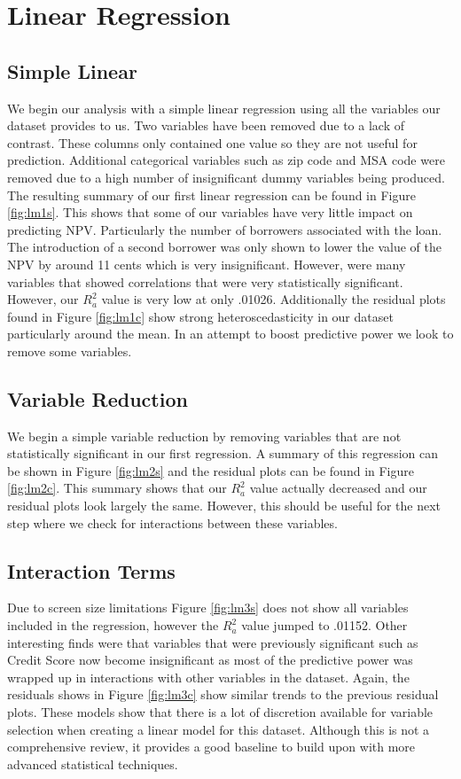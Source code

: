 \documentclass[10pt,twocolumn,letterpaper]{article}
\begin{document}

\section{Linear Regression}
\subsection{Simple Linear}
We begin our analysis with a simple linear regression using all the variables our dataset provides to us. Two variables have been removed due to a lack of contrast. These columns only contained one value so they are not useful for prediction. Additional categorical variables such as zip code and MSA code were removed due to a high number of insignificant dummy variables being produced. The resulting summary of our first linear regression can be found in Figure \ref{fig:lm1s}. This shows that some of our variables have very little impact on predicting NPV. Particularly the number of borrowers associated with the loan. The introduction of a second borrower was only shown to lower the value of the NPV by around 11 cents which is very insignificant. However, were many variables that showed correlations that were very statistically significant. However, our $R^2_a$ value is very low at only .01026. Additionally the residual plots found in Figure \ref{fig:lm1c} show strong heteroscedasticity in our dataset particularly around the mean. In an attempt to boost predictive power we look to remove some variables. 

\subsection{Variable Reduction}

We begin a simple variable reduction by removing variables that are not statistically significant in our first regression. A summary of this regression can be shown in Figure \ref{fig:lm2s} and the residual plots can be found in Figure \ref{fig:lm2c}. This summary shows that our $R^2_a$ value actually decreased and our residual plots look largely the same. However, this should be useful for the next step where we check for interactions between these variables.

\subsection{Interaction Terms}
Due to screen size limitations Figure \ref{fig:lm3s} does not show all variables included in the regression, however the $R^2_a$ value jumped to .01152. Other interesting finds were that variables that were previously significant such as Credit Score now become insignificant as most of the predictive power was wrapped up in interactions with other variables in the dataset. Again, the residuals shows in Figure \ref{fig:lm3c} show similar trends to the previous residual plots. These models show that there is a lot of discretion available for variable selection when creating a linear model for this dataset. Although this is not a comprehensive review, it provides a good baseline to build upon with more advanced statistical techniques.
\end{document}
